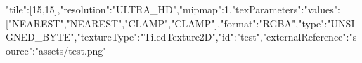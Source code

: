 {"tile":[15,15],"resolution":"ULTRA_HD","mipmap":1,"texParameters":{"values":["NEAREST","NEAREST","CLAMP","CLAMP"]},"format":"RGBA","type":"UNSIGNED_BYTE","textureType":"TiledTexture2D","id":"test","externalReference":{"source":"assets/test.png"}}
